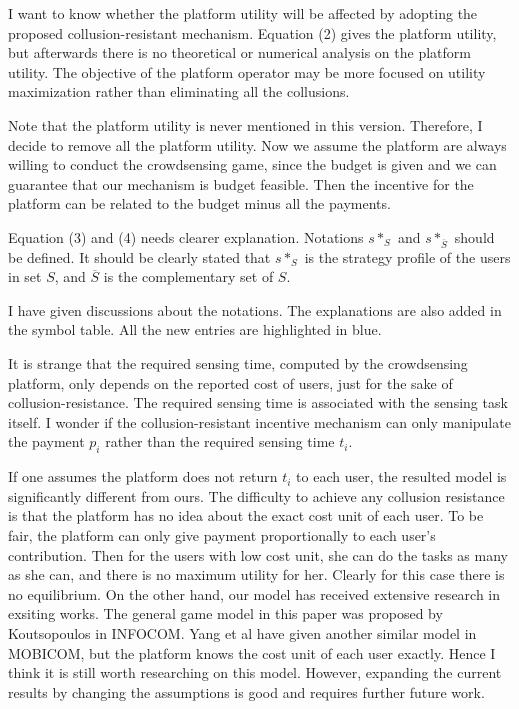 \documentclass[a4paper,11pt]{exam}
\begin{document}
\begin{questions}
\question I want to know whether the platform utility will be affected by adopting the proposed collusion-resistant mechanism. Equation (2) gives the platform utility, but afterwards there is no theoretical or numerical analysis on the platform utility. The objective of the platform operator may be more focused on utility maximization rather than eliminating all the collusions.
\begin{solution}
Note that the platform utility is never mentioned in this version. Therefore, I decide to remove all the platform utility. Now we assume the platform are always willing to conduct the crowdsensing game, since the budget is given and we can guarantee that our mechanism is budget feasible. Then the incentive for the platform can be related to the budget minus all the payments.
\end{solution}

\question Equation (3) and (4) needs clearer explanation. Notations $s*_S$ and $s*_{\overline{S}}$ should be defined. It should be clearly stated that $s*_S$ is the strategy profile of the users in set $S$, and $\overline{S}$ is the complementary set of $S$. 
\begin{solution}
I have given discussions about the notations. The explanations are also added in the symbol table. All the new entries are highlighted in blue.
\end{solution}

\question It is strange that the required sensing time, computed by the crowdsensing platform, only depends on the reported cost of users, just for the sake of collusion-resistance. The required sensing time is associated with the sensing task itself. I wonder if the collusion-resistant incentive mechanism can only manipulate the payment $p_i$ rather than the required sensing time $t_i$. 
\begin{solution}
If one assumes the platform does not return $t_i$ to each user, the resulted model is significantly different from ours. The difficulty to achieve any collusion resistance is that the platform has no idea about the exact cost unit of each user. To be fair, the platform can only give payment proportionally to each user's contribution. Then for the users with low cost unit, she can do the tasks as many as she can, and there is no maximum utility for her. Clearly for this case there is no equilibrium. On the other hand, our model has received extensive research in exsiting works. 
The general game model in this paper was proposed by Koutsopoulos in INFOCOM. Yang et al have given another similar model in MOBICOM, but the platform knows the cost unit of each user exactly. Hence I think it is still worth researching on this model. However, expanding the current results by changing the assumptions is good and requires further future work.
\end{solution}


\end{questions}
\end{document}
